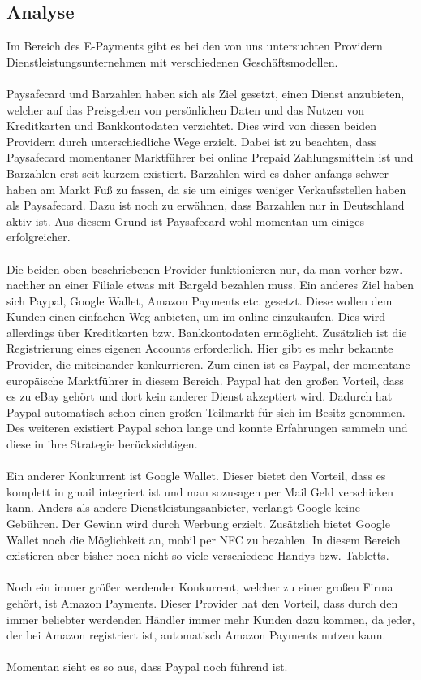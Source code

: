 \subsection{Analyse}
Im Bereich des E-Payments gibt es bei den von uns untersuchten Providern Dienstleistungsunternehmen mit verschiedenen Geschäftsmodellen.\\
\\
Paysafecard und Barzahlen haben sich als Ziel gesetzt, einen Dienst anzubieten, welcher auf das Preisgeben von persönlichen Daten und das Nutzen von Kreditkarten und Bankkontodaten verzichtet. Dies wird von diesen beiden Providern durch unterschiedliche Wege erzielt. Dabei ist zu beachten, dass Paysafecard momentaner Marktführer bei online Prepaid Zahlungsmitteln ist und Barzahlen erst seit kurzem existiert. Barzahlen wird es daher anfangs schwer haben am Markt Fuß zu fassen, da sie um einiges weniger Verkaufsstellen haben als Paysafecard. Dazu ist noch zu erwähnen, dass Barzahlen nur in Deutschland aktiv ist. Aus diesem Grund ist Paysafecard wohl momentan um einiges erfolgreicher.\\
\\
Die beiden oben beschriebenen Provider funktionieren nur, da man vorher bzw. nachher an einer Filiale etwas mit Bargeld bezahlen muss. Ein anderes Ziel haben sich Paypal, Google Wallet, Amazon Payments etc. gesetzt. Diese wollen dem Kunden einen einfachen Weg anbieten, um im online einzukaufen. Dies wird allerdings über Kreditkarten bzw. Bankkontodaten ermöglicht. Zusätzlich ist die Registrierung eines eigenen Accounts erforderlich. Hier gibt es mehr bekannte Provider, die miteinander konkurrieren. Zum einen ist es Paypal, der momentane europäische Marktführer in diesem Bereich. Paypal hat den großen Vorteil, dass es zu eBay gehört und dort kein anderer Dienst akzeptiert wird. Dadurch hat Paypal automatisch schon einen großen Teilmarkt für sich im Besitz genommen. Des weiteren existiert Paypal schon lange und konnte Erfahrungen sammeln und diese in ihre Strategie berücksichtigen.\\
\\
Ein anderer Konkurrent ist Google Wallet. Dieser bietet den Vorteil, dass es komplett in gmail integriert ist und man sozusagen per Mail Geld verschicken kann. Anders als andere Dienstleistungsanbieter, verlangt Google keine Gebühren. Der Gewinn wird durch Werbung erzielt. Zusätzlich bietet Google Wallet noch die Möglichkeit an, mobil per NFC zu bezahlen. In diesem Bereich existieren aber bisher noch nicht so viele verschiedene Handys bzw. Tabletts.\\
\\
Noch ein immer größer werdender Konkurrent, welcher zu einer großen Firma gehört, ist Amazon Payments. Dieser Provider hat den Vorteil, dass durch den immer beliebter werdenden Händler immer mehr Kunden dazu kommen, da jeder, der bei Amazon registriert ist, automatisch Amazon Payments nutzen kann.\\
\\
Momentan sieht es so aus, dass Paypal noch führend ist.

